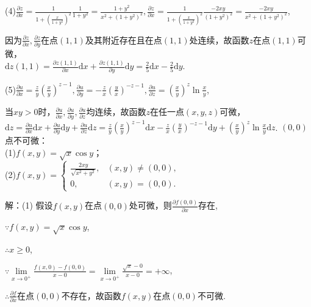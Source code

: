 \documentclass[12pt,UTF8]{ctexart}
\begin{document}
\begin{enumerate}
(4)$\frac{\partial z}{\partial x}=\frac1{1+(\frac x{1+y^2})^2}\frac1{1+y^2}=\frac{1+y^2}{x^2+(1+y^2)^2},\frac{\partial z}{\partial x}=\frac1{1+(\frac x{1+y^2})^2}\frac{-2xy}{(1+y^2)^2}=\frac{-2xy}{x^2+(1+y^2)^2}$,

因为$\frac{\partial z}{\partial x},\frac{\partial z}{\partial y}$在点$(1,1)$及其附近存在且在点$(1,1)$处连续，故函数$z$在点$(1,1)$可微，\\
$\mathrm dz(1,1)=\frac{\partial z(1,1)}{\partial x}\mathrm dx+\frac{\partial z(1,1)}{\partial y}\mathrm dy=\frac25\mathrm dx-\frac25\mathrm dy$.

(5)$\frac{\partial u}{\partial x}=\frac zy(\frac xy)^{z-1},\frac{\partial u}{\partial y}=-\frac zx(\frac yx)^{-z-1},\frac{\partial u}{\partial z}=(\frac xy)^z\ln\frac xy$,

当$xy>0$时，$\frac{\partial u}{\partial x},\frac{\partial u}{\partial y},\frac{\partial u}{\partial z}$均连续，故函数$z$在任一点$(x,y,z)$可微，\\
$\mathrm dz=\frac{\partial u}{\partial x}\mathrm dx+\frac{\partial u}{\partial y}\mathrm dy+\frac{\partial u}{\partial z}\mathrm dz=\frac zy(\frac xy)^{z-1}\mathrm dx-\frac zx(\frac yx)^{-z-1}\mathrm dy+(\frac xy)^z\ln\frac xy\mathrm dz$.
$(0,0)$点不可微：\\
(1)$f(x,y)=\sqrt x\cos y$；\\
(2)$f(x,y)=\begin{cases}
\frac{2xy}{\sqrt{x^2+y^2}},&(x,y)\neq(0,0),\\
0,&(x,y)=(0,0).
\end{cases}$

解：(1)
%
%
%
假设$f(x,y)$在点$(0,0)$处可微，则$\frac{\partial f(0,0)}{\partial x}$存在,

$\because f(x,y)=\sqrt x\cos y$,

$\therefore x\geq0$,

$\because\lim\limits_{x\rightarrow0^+}\frac{f(x,0)-f(0,0)}{x-0}=\lim\limits_{x\rightarrow0^+}\frac{\sqrt x-0}{x-0}=+\infty$,

$\therefore\frac{\partial f}{\partial x}$在点$(0,0)$不存在，故函数$f(x,y)$在点$(0,0)$不可微.


\end{enumerate}
\end{document}
